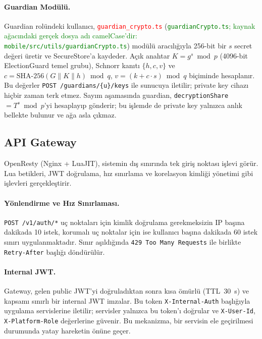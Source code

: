 \documentclass[a4paper,fleqn]{cas-sc}
\begin{document}
\paragraph{Guardian Modülü.}
Guardian rolündeki kullanıcı,
\textcolor{red}{\texttt{guardian\_crypto.ts}}
(\textcolor{green}{\texttt{guardianCrypto.ts}; kaynak ağacındaki gerçek dosya adı camelCase'dir: \texttt{mobile/src/utils/guardianCrypto.ts}})
modülü
aracılığıyla 256-bit bir $s$ secret değeri üretir ve SecureStore'a kaydeder.
Açık anahtar $K = g^s \bmod p$ (4096-bit ElectionGuard temel grubu),
Schnorr kanıtı $\{h, c, v\}$ ve $c = \text{SHA-256}(G \| K \| h) \bmod q$,
$v = (k + c \cdot s) \bmod q$ biçiminde hesaplanır.
Bu değerler \texttt{POST /guardians/\{u\}/keys} ile sunucuya iletilir;
private key cihazı hiçbir zaman terk etmez.
Sayım aşamasında guardian, \texttt{decryptionShare} $= T^s \bmod p$'yi
hesaplayıp gönderir; bu işlemde de private key yalnızca anlık bellekte
bulunur ve ağa asla çıkmaz.

\subsection{API Gateway}
\label{subsec:gateway}

OpenResty (Nginx + LuaJIT), sistemin dış sınırında tek giriş noktası
işlevi görür.
Lua betikleri, JWT doğrulama, hız sınırlama ve korelasyon kimliği
yönetimi gibi işlevleri gerçekleştirir.

\paragraph{Yönlendirme ve Hız Sınırlaması.}
\texttt{POST /v1/auth/*} uç noktaları için kimlik doğrulama gerekmeksizin
IP başına dakikada 10 istek, korumalı uç noktalar için ise kullanıcı
başına dakikada 60 istek sınırı uygulanmaktadır.
Sınır aşıldığında \texttt{429~Too Many Requests} ile birlikte
\texttt{Retry-After} başlığı döndürülür.

\paragraph{Internal JWT.}
Gateway, gelen public JWT'yi doğruladıktan sonra kısa ömürlü (TTL~30~s)
ve kapsamı sınırlı bir internal JWT imzalar.
Bu token \texttt{X-Internal-Auth} başlığıyla uygulama servislerine
iletilir; servisler yalnızca bu token'ı doğrular ve \texttt{X-User-Id},
\texttt{X-Platform-Role} değerlerine güvenir.
Bu mekanizma, bir servisin ele geçirilmesi durumunda yatay hareketin
önüne geçer.
\end{document}
